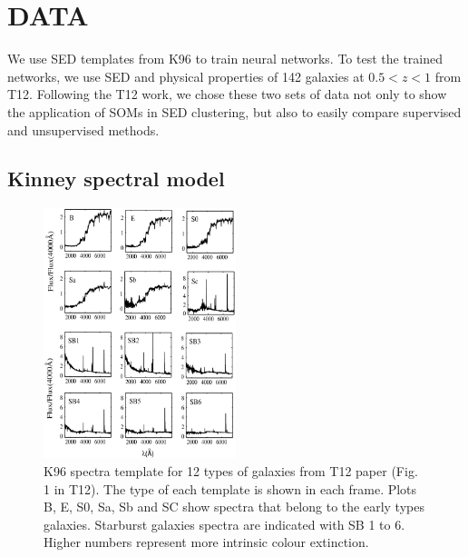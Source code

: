 
\section{DATA}
\label{sec: data}
We use SED templates from K96 to train neural networks.
To test the trained networks, we use SED and physical properties of 142 galaxies at $0.5<z<1$ from T12.
Following the T12 work, we chose these two sets of data not only to show the application of SOMs in SED clustering, but also to easily compare supervised and unsupervised methods.

 \subsection{Kinney spectral model}
     \begin{figure}
        \centering
        \includegraphics[width=0.5\textwidth]{images/k96.jpg}
        \caption{K96 spectra template for 12 types of galaxies from T12 paper (Fig. 1 in T12). The type of each template is shown in each frame. Plots B, E, S0, Sa, Sb and SC show spectra that belong to the early types galaxies. Starburst galaxies spectra are indicated with SB 1 to 6. Higher numbers represent more intrinsic colour extinction.}
        \label{fig: k96}
    \end{figure}
      
